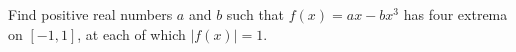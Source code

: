Find positive real numbers $a$ and $b$ such that $f(x) = ax - bx^3$ has four
extrema on $[-1, 1]$, at each of which $|f(x)| = 1$.

